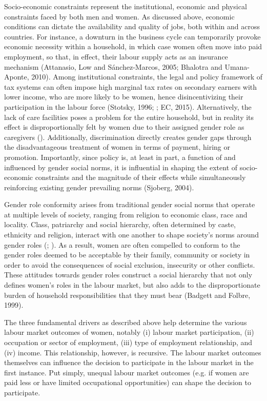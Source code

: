 Socio-economic constraints represent the institutional, economic and physical constraints faced by both men and women. As discussed above, economic conditions can dictate the availability and quality of jobs, both within and across countries. For instance, a downturn in the business cycle can temporarily provoke economic necessity within a household, in which case women often move into paid employment, so that, in effect, their labour supply acts as an insurance mechanism (Attanasio, Low and Sánchez-Marcos, 2005; Bhalotra and Umana-Aponte, 2010). Among institutional constraints, the legal and policy framework of tax systems can often impose high marginal tax rates on secondary earners with lower income, who are more likely to be women, hence disincentivizing their participation in the labour force (Stotsky, 1996; \cite{Jaumotte2003}; EC, 2015). Alternatively, the lack of care facilities poses a problem for the entire household, but in reality its effect is disproportionally felt by women due to their assigned gender role as caregivers (\cite{badgett1999assigning}). Additionally, discrimination directly creates gender gaps through the disadvantageous treatment of women in terms of payment, hiring or promotion. Importantly, since policy is, at least in part, a function of and influenced by gender social norms, it is influential in shaping the extent of socio-economic constraints and the magnitude of their effects while simultaneously reinforcing existing gender prevailing norms (Sjoberg, 2004).
  
Gender role conformity arises from traditional gender social norms that operate at multiple levels   of society, ranging from religion to economic class, race and locality. Class, patriarchy and social hierarchy, often determined by caste, ethnicity and religion, interact with one another to shape society's norms around gender roles (\cite{bardhan1984land}; \cite{klasen2012push}). As a result, women are often compelled to conform to the gender roles deemed to be acceptable by their family, community or society in order to avoid the consequences of social exclusion, insecurity or other conflicts. These attitudes towards gender roles construct a social hierarchy that not only defines women's roles in the labour market, but also adds to the disproportionate burden of household responsibilities that they must bear (Badgett and Folbre, 1999).

The three fundamental drivers as described above help determine the various labour market outcomes of women, notably (i) labour market participation, (ii) occupation or sector of employment, (iii) type of employment relationship, and (iv) income. This relationship, however, is recursive. The labour market outcomes themselves can influence the decision to participate in the labour market in the first instance. Put simply, unequal labour market outcomes (e.g. if women are paid less or have limited occupational opportunities) can shape the decision to participate. 

